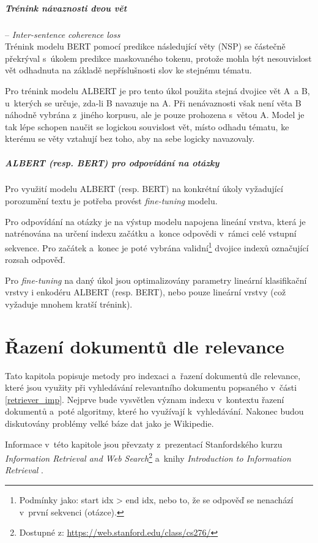\paragraph{Trénink návaznosti dvou vět} -- \textit{Inter-sentence coherence loss}\\
Trénink modelu BERT pomocí predikce následující věty (NSP) se částečně překrýval s~úkolem predikce maskovaného tokenu, protože mohla být nesouvislost vět odhadnuta na základě nepříslušnosti slov ke stejnému tématu.\par
Pro trénink modelu ALBERT je pro tento úkol použita stejná dvojice vět A~a B, u~kterých se určuje, zda-li B navazuje na A. Při nenávaznosti však není věta B náhodně vybrána z~jiného korpusu, ale je pouze prohozena s~větou A. Model je tak lépe schopen naučit se logickou souvislost vět, místo odhadu tématu, ke kterému se věty vztahují bez toho, aby na sebe logicky navazovaly.
\bigskip\bigskip
\paragraph{ALBERT (resp. BERT) pro odpovídání na otázky}
Pro využití modelu ALBERT (resp. BERT) na konkrétní úkoly vyžadující porozumění textu je potřeba provést \emph{fine-tuning} modelu.\par
Pro odpovídání na otázky je na výstup modelu napojena lineání vrstva, která je natrénována na určení indexu začátku a~konce odpovědi v~rámci celé vstupní sekvence. Pro začátek a~konec je poté vybrána validní\footnote{Podmínky jako: start idx > end idx, nebo to, že se odpověď se nenachází v~první sekvenci (otázce).} dvojice indexů označující rozsah odpověď.\par
Pro \emph{fine-tuning} na daný úkol jsou optimalizovány parametry lineární klasifikační vrstvy i enkodéru ALBERT (resp. BERT), nebo pouze lineární vrstvy (což vyžaduje mnohem kratší trénink).


\chapter{Řazení dokumentů dle relevance}
\label{document_indexing}
Tato kapitola popisuje metody pro indexaci a~řazení dokumentů dle relevance, které jsou využity při vyhledávání relevantního dokumentu popsaného v~části \ref{retriever_imp}. Nejprve bude vysvětlen význam indexu v~kontextu řazení dokumentů a~poté algoritmy, které ho využívají k~vyhledávání. Nakonec budou diskutovány problémy velké báze dat jako je Wikipedie.\par
Informace v~této kapitole jsou převzaty z~prezentací Stanfordského kurzu \emph{Information Retrieval and Web Search}\footnote{Dostupné z: \url{https://web.stanford.edu/class/cs276/}} a~knihy \emph{Introduction to Information Retrieval} \cite{information_retrieval}.

